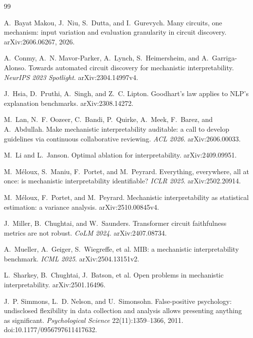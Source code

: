 \documentclass[11pt]{article}
\begin{document}

\begin{thebibliography}{99}

A.~Bayat Makou, J.~Niu, S.~Dutta, and I.~Gurevych.
Many circuits, one mechanism: input variation and evaluation granularity in
circuit discovery. arXiv:2606.06267, 2026.

A.~Conmy, A.~N. Mavor-Parker, A.~Lynch, S.~Heimersheim, and A.~Garriga-Alonso.
Towards automated circuit discovery for mechanistic interpretability.
\emph{NeurIPS 2023 Spotlight}. arXiv:2304.14997v4.

J.~Hsia, D.~Pruthi, A.~Singh, and Z.~C. Lipton.
Goodhart's law applies to NLP's explanation benchmarks. arXiv:2308.14272.

M.~Lan, N.~F. Oozeer, C.~Bandi, P.~Quirke, A.~Meek, F.~Barez, and A.~Abdullah.
Make mechanistic interpretability auditable: a call to develop guidelines via
continuous collaborative reviewing. \emph{ACL 2026}. arXiv:2606.00033.

M.~Li and L.~Janson. Optimal ablation for interpretability. arXiv:2409.09951.

M.~M\'eloux, S.~Maniu, F.~Portet, and M.~Peyrard.
Everything, everywhere, all at once: is mechanistic interpretability
identifiable? \emph{ICLR 2025}. arXiv:2502.20914.

M.~M\'eloux, F.~Portet, and M.~Peyrard. Mechanistic interpretability as
statistical estimation: a variance analysis. arXiv:2510.00845v4.

J.~Miller, B.~Chughtai, and W.~Saunders.
Transformer circuit faithfulness metrics are not robust.
\emph{CoLM 2024}. arXiv:2407.08734.

A.~Mueller, A.~Geiger, S.~Wiegreffe, et al. MIB: a mechanistic interpretability
benchmark. \emph{ICML 2025}. arXiv:2504.13151v2.

L.~Sharkey, B.~Chughtai, J.~Batson, et al.
Open problems in mechanistic interpretability. arXiv:2501.16496.

J.~P. Simmons, L.~D. Nelson, and U.~Simonsohn.
False-positive psychology: undisclosed flexibility in data collection and
analysis allows presenting anything as significant.
\emph{Psychological Science} 22(11):1359--1366, 2011.
doi:10.1177/0956797611417632.


\end{thebibliography}
\end{document}
